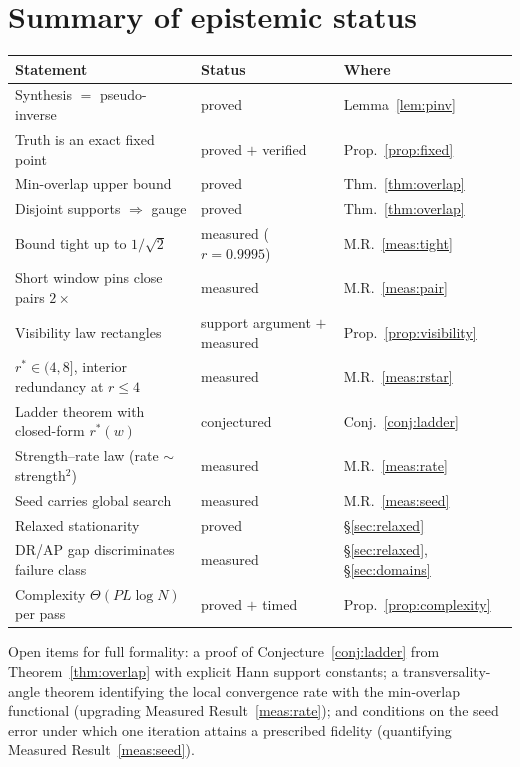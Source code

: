 \documentclass[11pt]{article}
\theoremstyle{definition}
\begin{document}
\section{Summary of epistemic status}

\begin{center}
\begin{tabular}{@{}lll@{}}
\toprule
Statement & Status & Where\\
\midrule
Synthesis $=$ pseudo-inverse & proved & Lemma~\ref{lem:pinv}\\
Truth is an exact fixed point & proved $+$ verified & Prop.~\ref{prop:fixed}\\
Min-overlap upper bound & proved & Thm.~\ref{thm:overlap}\\
Disjoint supports $\Rightarrow$ gauge & proved & Thm.~\ref{thm:overlap}\\
Bound tight up to $1/\sqrt2$ & measured ($r{=}0.9995$) & M.R.~\ref{meas:tight}\\
Short window pins close pairs $2\times$ & measured & M.R.~\ref{meas:pair}\\
Visibility law rectangles & support argument $+$ measured & Prop.~\ref{prop:visibility}\\
$r^{*}\in(4,8]$, interior redundancy at $r{\le}4$ & measured & M.R.~\ref{meas:rstar}\\
Ladder theorem with closed-form $r^{*}(w)$ & conjectured & Conj.~\ref{conj:ladder}\\
Strength--rate law (rate $\sim$ strength$^2$) & measured & M.R.~\ref{meas:rate}\\
Seed carries global search & measured & M.R.~\ref{meas:seed}\\
Relaxed stationarity & proved & \S\ref{sec:relaxed}\\
DR/AP gap discriminates failure class & measured & \S\ref{sec:relaxed}, \S\ref{sec:domains}\\
Complexity $\Theta(PL\log N)$ per pass & proved $+$ timed & Prop.~\ref{prop:complexity}\\
\bottomrule
\end{tabular}
\end{center}

Open items for full formality: a proof of Conjecture~\ref{conj:ladder}
from Theorem~\ref{thm:overlap} with explicit Hann support constants; a
transversality-angle theorem identifying the local convergence rate with
the min-overlap functional (upgrading Measured Result~\ref{meas:rate});
and conditions on the seed error under which one iteration attains a
prescribed fidelity (quantifying Measured Result~\ref{meas:seed}).
\end{document}
